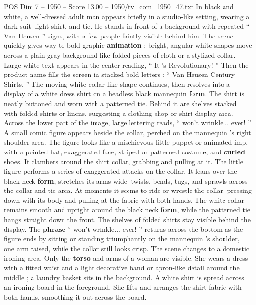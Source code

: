 \begin{textsample}{POS Dim 7 – 1950 – Score 13.00 – 1950/tv\_com\_1950\_47.txt}  \label{ex:f7_pos_020}
In black and white, a well-dressed adult man appears briefly in a studio-like setting, wearing a dark suit, light shirt, and tie.
He stands in front of a background with repeated “ Van Heusen ” signs, with a few people faintly visible behind him.
The scene quickly gives way to bold graphic \textbf{animation} : bright, angular white shapes move across a plain gray background like folded pieces of cloth or a stylized collar.
Large white text appears in the center reading, “ It ’s Revolutionary! ” Then the product name fills the screen in stacked bold letters : “ Van Heusen Century Shirts. ” The moving white collar-like shape continues, then resolves into a display of a white dress shirt on a headless black mannequin \textbf{form}.
The shirt is neatly buttoned and worn with a patterned tie.
Behind it are shelves stacked with folded shirts or linens, suggesting a clothing shop or shirt display area.
Across the lower part of the image, large lettering reads, “ won't wrinkle... ever! ” A small comic figure appears beside the collar, perched on the mannequin ’s right shoulder area.
The figure looks like a mischievous little puppet or animated imp, with a pointed hat, exaggerated face, striped or patterned costume, and \textbf{curled} shoes.
It clambers around the shirt collar, grabbing and pulling at it.
The little figure performs a series of exaggerated attacks on the collar.
It leans over the black neck \textbf{form}, stretches its arms wide, twists, bends, tugs, and sprawls across the collar and tie area.
At moments it seems to ride or wrestle the collar, pressing down with its body and pulling at the fabric with both hands.
The white collar remains smooth and upright around the black neck \textbf{form}, while the patterned tie hangs straight down the front.
The shelves of folded shirts stay visible behind the display.
The \textbf{phrase} “ won't wrinkle... ever! ” returns across the bottom as the figure ends by sitting or standing triumphantly on the mannequin ’s shoulder, one arm raised, while the collar still looks crisp.
The scene changes to a domestic ironing area.
Only the \textbf{torso} and arms of a woman are visible.
She wears a dress with a fitted waist and a light decorative band or apron-like detail around the middle ; a laundry basket sits in the background.
A white shirt is spread across an ironing board in the foreground.
She lifts and arranges the shirt fabric with both hands, smoothing it out across the board.

\end{textsample}
